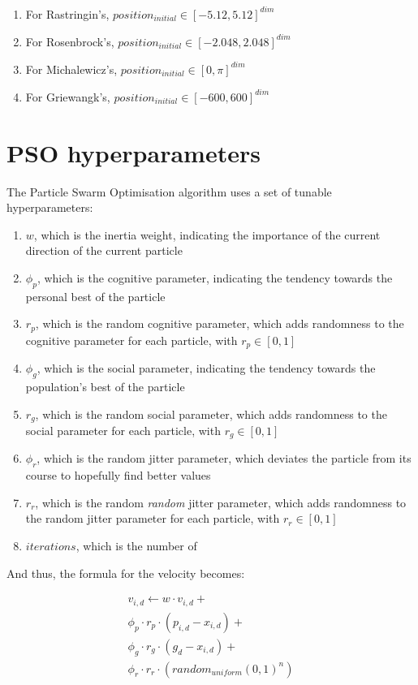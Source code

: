 \documentclass[conference]{IEEEtran}
\begin{document}
\begin{enumerate}
    \item For Rastringin's, $position_{initial} \in [-5.12, 5.12]^{dim}$
    \item For Rosenbrock's, $position_{initial} \in [-2.048, 2.048]^{dim}$
    \item For Michalewicz's, $position_{initial} \in [0, \pi]^{dim}$
    \item For Griewangk's, $position_{initial} \in [-600, 600]^{dim}$
\end{enumerate}

\section{PSO hyperparameters}
The Particle Swarm Optimisation algorithm uses a set of tunable hyperparameters:

\begin{enumerate}
    \item $w$, which is the inertia weight, indicating the importance of the current direction of the current particle 
    \item $\phi_p$, which is the cognitive parameter, indicating the tendency towards the personal best of the particle
    \item $r_p$, which is the random cognitive parameter, which adds randomness to the cognitive parameter for each particle, with $r_p \in [0, 1]$
    \item $\phi_g$, which is the social parameter, indicating the tendency towards the population's best of the particle
    \item $r_g$, which is the random social parameter, which adds randomness to the social parameter for each particle, with $r_g \in [0, 1]$ 
    \item $\phi_r$, which is the random jitter parameter, which deviates the particle from its course to hopefully find better values
    \item $r_r$, which is the random \textit{random} jitter parameter, which adds randomness to the random jitter parameter for each particle, with $r_r \in [0, 1]$
    \item $iterations$, which is the number of 
\end{enumerate}

And thus, the formula for the velocity becomes:

\begin{multline}
    v_{i,d} \leftarrow w \cdot v_{i,d}  + \\ \phi_p \cdot r_p \cdot (p_{i,d} - x_{i,d})  + \\ \phi_g \cdot r_g \cdot (g_d - x_{i,d}) + \\ \phi_r \cdot r_r \cdot (random_{uniform}(0, 1)^n)
\end{multline}
\end{document}
